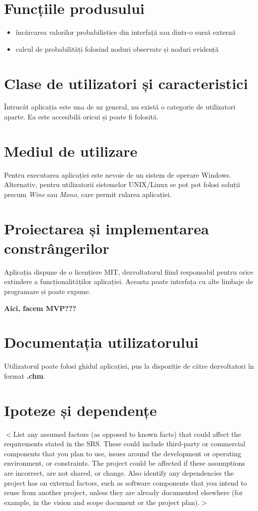 \documentclass{scrreprt}
\begin{document}
\section{Funcțiile produsului}
\begin{itemize}
	\item încărcarea valorilor probabilistice din interfață sau dintr-o sursă externă
	\item calcul de probabilități folosind noduri observate și noduri evidență
\end{itemize}

\section{Clase de utilizatori și caracteristici}
Întrucât aplicația este una de uz general, nu există o categorie de utilizatori aparte. Ea este accesibilă oricui și poate fi folosită.

\section{Mediul de utilizare}
Pentru executarea aplicației este nevoie de un sistem de operare Windows. Alternativ, pentru utilizatorii sistemelor UNIX/Linux se pot pot folosi soluții precum \textit{Wine} sau \textit{Mono}, care permit rularea aplicației.

\section{Proiectarea și implementarea constrângerilor}
Aplicația dispune de o licențiere MIT, dezvoltatorul fiind responsabil pentru orice extindere a funcționalităților aplicației. Aceasta poate interfața cu alte limbaje de programare și poate expune.\par
\textbf{Aici, facem MVP???}

\section{Documentația utilizatorului}
Utilizatorul poate folosi ghidul aplicației, pus la dispoziție de către dezvoltatori în format \textbf{.chm}.

\section{Ipoteze și dependențe}
$<$List any assumed factors (as opposed to known facts) that could affect the 
requirements stated in the SRS. These could include third-party or commercial 
components that you plan to use, issues around the development or operating 
environment, or constraints. The project could be affected if these assumptions 
are incorrect, are not shared, or change. Also identify any dependencies the 
project has on external factors, such as software components that you intend to 
reuse from another project, unless they are already documented elsewhere (for 
example, in the vision and scope document or the project plan).$>$
\end{document}
